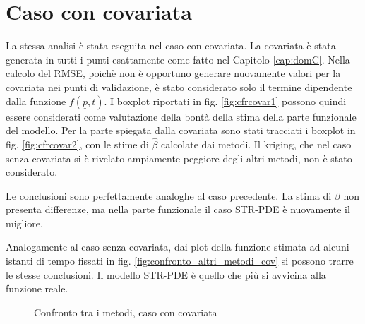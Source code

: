 \documentclass[a4paper,11pt,twoside,openright]{book}							%
\begin{document}
\section{Caso con covariata}

La stessa analisi è stata eseguita nel caso con covariata. La covariata è stata generata in tutti i punti esattamente come fatto nel Capitolo \ref{cap:domC}. Nella calcolo del RMSE, poichè non è opportuno generare nuovamente valori per la covariata nei punti di validazione, è stato considerato solo il termine dipendente dalla funzione $f(\underline p,t)$. I boxplot riportati in fig. \ref{fig:cfrcovar1} possono quindi essere considerati come valutazione della bontà della stima della parte funzionale del modello. Per la parte spiegata dalla covariata sono stati tracciati i boxplot in fig. \ref{fig:cfrcovar2}, con le stime di $\hat{\beta}$ calcolate dai metodi. Il kriging, che nel caso senza covariata si è rivelato ampiamente peggiore degli altri metodi, non è stato considerato.

Le conclusioni sono perfettamente analoghe al caso precedente. La stima di $\beta$ non presenta differenze, ma nella parte funzionale il caso STR-PDE è nuovamente il migliore.

Analogamente al caso senza covariata, dai plot della funzione stimata ad alcuni istanti di tempo fissati in fig. \ref{fig:confronto_altri_metodi_cov} si possono trarre le stesse conclusioni. Il modello STR-PDE è quello che più si avvicina alla funzione reale.

\begin{figure}[t]
	\centering
	\caption{Confronto tra i metodi, caso con covariata}
	\label{fig:cfrcovar}
\end{figure}
\end{document}

